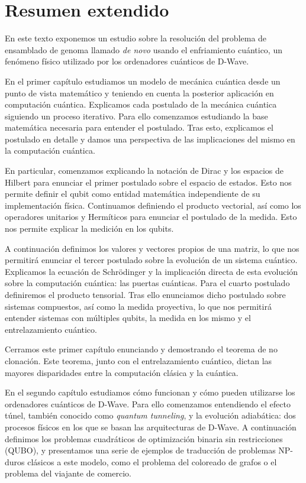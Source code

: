 \chapter*{Resumen extendido}

En este texto exponemos un estudio sobre la resolución del problema de ensamblado de genoma llamado \emph{de novo} usando el enfriamiento cuántico, un fenómeno físico utilizado por los ordenadores cuánticos de D-Wave.

En el primer capítulo estudiamos un modelo de mecánica cuántica desde un punto de vista matemático y teniendo en cuenta la posterior aplicación en computación cuántica. Explicamos cada postulado de la mecánica cuántica siguiendo un proceso iterativo. Para ello comenzamos estudiando la base matemática necesaria para entender el postulado. Tras esto, explicamos el postulado en detalle y damos una perspectiva de las implicaciones del mismo en la computación cuántica.

En particular, comenzamos explicando la notación de Dirac y los espacios de Hilbert para enunciar el primer postulado sobre el espacio de estados. Esto nos permite definir el qubit como entidad matemática independiente de su implementación física. Continuamos definiendo el producto vectorial, así como los operadores unitarios y Hermíticos para enunciar el postulado de la medida. Esto nos permite explicar la medición en los qubits.

A continuación definimos los valores y vectores propios de una matriz, lo que nos permitirá enunciar el tercer postulado sobre la evolución de un sistema cuántico. Explicamos la ecuación de Schrödinger y la implicación directa de esta evolución sobre la computación cuántica: las puertas cuánticas. Para el cuarto postulado definiremos el producto tensorial. Tras ello enunciamos dicho postulado sobre sistemas compuestos, así como la medida proyectiva, lo que nos permitirá entender sistemas con múltiples qubits, la medida en los mismo y el entrelazamiento cuántico.

Cerramos este primer capítulo enunciando y demostrando el teorema de no clonación. Este teorema, junto con el entrelazamiento cuántico, dictan las mayores disparidades entre la computación clásica y la cuántica.

En el segundo capítulo estudiamos cómo funcionan y cómo pueden utilizarse los ordenadores cuánticos de D-Wave. Para ello comenzamos entendiendo el efecto túnel, también conocido como \emph{quantum tunneling}, y la evolución adiabática: dos procesos físicos en los que se basan las arquitecturas de D-Wave. A continuación definimos los problemas cuadráticos de optimización binaria sin restricciones (QUBO), y presentamos una serie de ejemplos de traducción de problemas NP-duros clásicos a este modelo, como el problema del coloreado de grafos o el problema del viajante de comercio.

